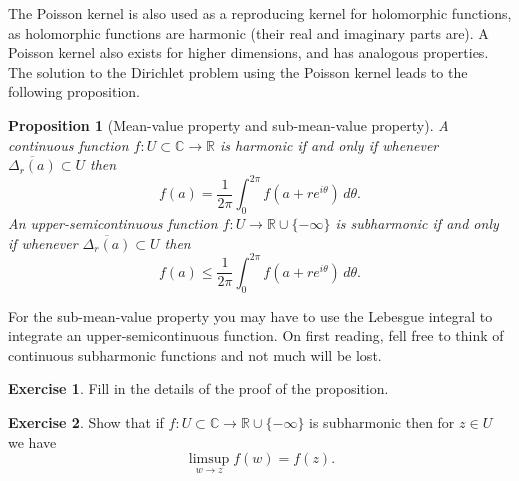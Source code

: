 \documentclass[12pt,openany]{book}
\newcommand{\C}{{\mathbb{C}}}
\newcommand{\R}{{\mathbb{R}}}
\theoremstyle{plain}
\newtheorem{prop}[thm]{Proposition}
\theoremstyle{remark}
\theoremstyle{definition}
\newenvironment{exbox}{%
    \def\FrameCommand{\vrule width 1pt \relax\hspace {10pt}}%
    \MakeFramed {\advance \hsize -\width \FrameRestore }%
}{%
    \endMakeFramed
}
\theoremstyle{exercise}
\newtheorem{exercise}{Exercise}[section]
\theoremstyle{example}
\begin{document}
The Poisson kernel is also used as a reproducing kernel for
holomorphic functions, as holomorphic functions are harmonic (their real and
imaginary parts are).
A Poisson kernel also exists for higher dimensions, and has
analogous properties.
The solution to the Dirichlet problem using the Poisson kernel leads to
the following proposition.

\begin{prop}[Mean-value property and sub-mean-value property]
A continuous function
$f \colon U \subset \C \to \R$
is harmonic if and only if whenever 
$\overline{\Delta_r(a)} \subset U$ then
\begin{equation*}
f(a) = \frac{1}{2\pi} \int_0^{2\pi} f(a+re^{i\theta})\, d\theta .
\end{equation*}
An upper-semicontinuous function $f \colon U \to \R \cup \{ -\infty \}$
is subharmonic if and only if whenever
$\overline{\Delta_r(a)} \subset U$ then
\begin{equation*}
f(a) \leq \frac{1}{2\pi} \int_0^{2\pi} f(a+re^{i\theta})\, d\theta .
\end{equation*}
\end{prop}

For the sub-mean-value property you may have to use 
the Lebesgue integral to integrate an upper-semicontinuous function.
On first reading, fell free to think of continuous subharmonic
functions and not much will be lost.

\begin{exbox}
\begin{exercise}
Fill in the details of the proof of the proposition.
\end{exercise}

\begin{exercise}
Show that if $f \colon U \subset \C \to \R \cup\{- \infty \}$ is subharmonic
then for $z \in U$ we have
\begin{equation*}
\limsup_{w \to z} f(w) = f(z) .
\end{equation*}
\end{exercise}
\end{exbox}
\end{document}
